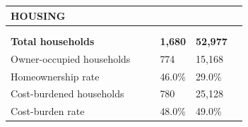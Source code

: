 \documentclass[9pt]{report}
\begin{document}
\vspace{12pt}
\setlength{\tabcolsep}{.01in} %
\begin{tabular}{p{.10in}p{.10in}p{.10in}p{3.7in}>{\hfill}p{.85in}>{\hfill}p{.85in}>{\hfill}p{.85in}>{\hfill}p{.85in}p{0.1in}}
\multicolumn{9}{l}{\parbox{7.1in}{\raggedright{\large{\strut\textbf{HOUSING}\strut}}}} \\ 
\hline
\multicolumn{4}{l}{\parbox{3.5in}{\raggedright{\textbf{}}}} & \multicolumn{1}{r}{\parbox{.85in}{\strut\raggedleft{\textbf{}\strut}}} & \multicolumn{1}{r}{\parbox{.85in}{\strut\raggedleft{\textbf{}\strut}}} & \multicolumn{1}{r}{\parbox{.85in}{\strut{}}} & \multicolumn{1}{r}{\parbox{.85in}{\strut{}}} & \\ 
\multicolumn{9}{l}{} \\ 
\multicolumn{4}{l}{\parbox{3.5in}{\strut\raggedright{\textbf{Total households}\strut}}} & \textbf{} & \textbf{} & \textbf{1,680} & \textbf{52,977} & \textbf{} \\ 
\multicolumn{4}{l}{\parbox{3.6in}{\strut\raggedright{{Owner-occupied households}}\strut}} &  &  & 774 & 15,168 & \multicolumn{1}{l}{}  \\ 
\multicolumn{4}{l}{\parbox{3.6in}{\strut\raggedright{{Homeownership rate}}\strut}} &  &  & 46.0\% & 29.0\% & \multicolumn{1}{l}{}  \\ 
\multicolumn{4}{l}{\parbox{3.6in}{\strut\raggedright{{Cost-burdened households}}\strut}} &  &  & 780 & 25,128 & \multicolumn{1}{l}{}  \\ 
\multicolumn{4}{l}{\parbox{3.6in}{\strut\raggedright{{Cost-burden rate}}\strut}} &  &  & 48.0\% & 49.0\% & \multicolumn{1}{l}{}  \\ 

\end{tabular}
\setlength{\tabcolsep}{6pt} %
\end{document}
